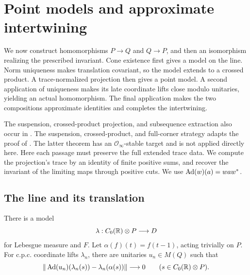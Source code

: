 \section{Point models and approximate intertwining}\label{pt:section}

We now construct homomorphisms \(P\to Q\) and \(Q\to P\),
and then an isomorphism realizing the prescribed invariant.
Cone existence first gives a model on the line. Norm uniqueness
makes translation covariant, so the model extends to a crossed
product. A trace-normalized projection then gives a point model.
A second application of uniqueness makes its late coordinate
lifts close modulo unitaries, yielding an actual homomorphism.
The final application makes the two compositions approximate
identities and completes the intertwining.

The suspension, crossed-product projection, and subsequence
extraction also occur in \cite[Remark~6.4]{GabeO2}. The suspension,
crossed-product, and full-corner strategy adapts the proof of
\cite[Theorem~14.1]{Gabe}. The latter theorem has an
\(\mathcal O_\infty\)-stable target and is not applied directly here.
Here each passage must preserve the
full extended trace data. We compute the projection's trace by
an identity of finite positive sums, and recover the invariant
of the limiting maps through positive cuts.
We use \(\operatorname{Ad}(w)(a)=waw^*\).

\subsection{The line and its translation}

\begin{proposition}\label{pt:suspension}
There is a model
\[
 \lambda:C_0(\mathbb R)\otimes P\longrightarrow D
\]
for Lebesgue measure and \(F\).
Let \(\alpha(f)(t)=f(t-1)\), acting trivially on \(P\).
For c.p.c. coordinate lifts \(\lambda_n\), there are
unitaries \(u_n\in M(Q)\) such that
\begin{equation}\label{pt:coordinate-covariance}
 \|\operatorname{Ad}(u_n)(\lambda_n(s))-\lambda_n(\alpha(s))\|
 \longrightarrow0\qquad(s\in C_0(\mathbb R)\otimes P).
\end{equation}
\end{proposition}

